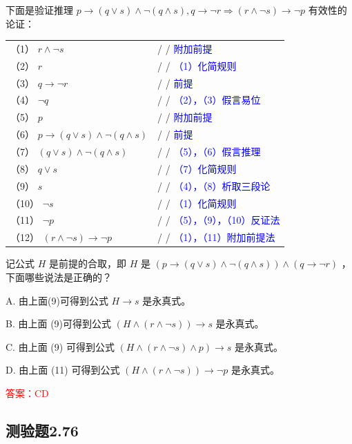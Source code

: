 \documentclass[UTF8, heading=true]{ctexart}
\begin{document}
下面是验证推理 $p \rightarrow(q \vee s) \wedge \neg(q \wedge s), q \rightarrow \neg r \Longrightarrow(r \wedge \neg s) \rightarrow \neg p$ 有效性的论证：
\begin{table}[H]
  \centering
  \renewcommand{\arraystretch}{1.5}
  \begin{tabular}{ll}
    （1）  $r \wedge \neg s$ & / / \textcolor{blue}{附加前提} \\
    （2）  $r$ & / / \textcolor{blue}{（1）化简规则} \\
    （3）  $q \rightarrow \neg r$ & / / \textcolor{blue}{前提} \\
    （4）  $\neg q$ & / / \textcolor{blue}{（2），（3）假言易位} \\
    （5）  $p$ & / / \textcolor{blue}{附加前提} \\
    （6）  $p \rightarrow(q \vee s) \wedge \neg(q \wedge s)$ & / / \textcolor{blue}{前提} \\
    （7）  $(q \vee s) \wedge \neg(q \wedge s)$ & / / \textcolor{blue}{（5），（6）假言推理} \\
    （8）  $q \vee s$ & / / \textcolor{blue}{（7）化简规则} \\
    （9）  $s$ & / / \textcolor{blue}{（4），（8）析取三段论} \\
    （10）  $\neg s$ & / / \textcolor{blue}{（1）化简规则} \\
    （11）  $\neg p$ & / / \textcolor{blue}{（5），（9），（10）反证法} \\
    （12）  $(r \wedge \neg s) \rightarrow \neg p$ & / / \textcolor{blue}{（1），（11）附加前提法} \\
  \end{tabular}
\end{table}

记公式 $H$ 是前提的合取，即 $H$ 是 $(p \rightarrow(q \vee s) \wedge \neg(q \wedge s)) \wedge(q \rightarrow \neg r)$ ，下面哪些说法是正确的？

A. 由上面(9)可得到公式 $H \rightarrow s$ 是永真式。

B. 由上面 (9)可得到公式 $(H \wedge(r \wedge \neg s)) \rightarrow s$ 是永真式。

C. 由上面 (9) 可得到公式 $(H \wedge(r \wedge \neg s) \wedge p) \rightarrow s$ 是永真式。

D. 由上面 (11) 可得到公式 $(H \wedge(r \wedge \neg s)) \rightarrow \neg p$ 是永真式。


\textcolor{red}{答案：CD}



\subsection{测验题2.76}
\end{document}
